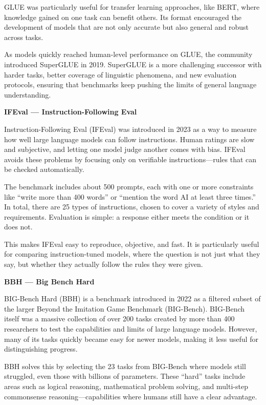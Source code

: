 GLUE was particularly useful for transfer learning approaches, like BERT, where knowledge gained on one task can benefit others. Its format
encouraged the development of models that are not only accurate but also general and robust across tasks.

As models quickly reached human-level performance on GLUE, the community introduced SuperGLUE in 2019. SuperGLUE is a more challenging successor
with harder tasks, better coverage of linguistic phenomena, and new evaluation protocols, ensuring that benchmarks keep pushing the limits of
general language understanding.

\textbf{IFEval — Instruction-Following Eval}


Instruction-Following Eval (IFEval) was introduced in 2023 as a way to measure how well large language models can follow instructions.
Human ratings are slow and subjective, and letting one model judge another comes with bias.
IFEval avoids these problems by focusing only on verifiable instructions—rules that can be checked automatically.

The benchmark includes about 500 prompts, each with one or more constraints like “write more than 400 words” or “mention the word AI at
least three times.” In total, there are 25 types of instructions, chosen to cover a variety of styles and requirements.
Evaluation is simple: a response either meets the condition or it does not.

This makes IFEval easy to reproduce, objective, and fast. It is particularly useful for comparing instruction-tuned models, where the question
is not just what they say, but whether they actually follow the rules they were given.

\textbf{BBH — Big Bench Hard}


BIG-Bench Hard (BBH) is a benchmark introduced in 2022 as a filtered subset of the larger Beyond the Imitation Game Benchmark (BIG-Bench).
BIG-Bench itself was a massive collection of over 200 tasks created by more than 400 researchers to test the capabilities and limits of large
language models. However, many of its tasks quickly became easy for newer models, making it less useful for distinguishing progress.

BBH solves this by selecting the 23 tasks from BIG-Bench where models still struggled, even those with billions of parameters. These “hard”
tasks include areas such as logical reasoning, mathematical problem solving, and multi-step commonsense reasoning—capabilities where humans still
have a clear advantage.

